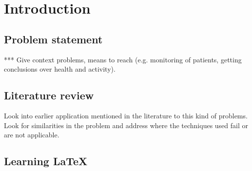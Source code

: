 
\chapter{Introduction} %

\label{Chapter1} %



\section{Problem statement}
*** Give context problems, means to reach (e.g. monitoring of patients, 
getting conclusions over health and activity).

\section{Literature review}
Look into earlier application mentioned in the literature to this kind of 
problems. Look for similarities in the problem and address where the 
techniques used fail or are not applicable.


\section{Learning \LaTeX{}}

